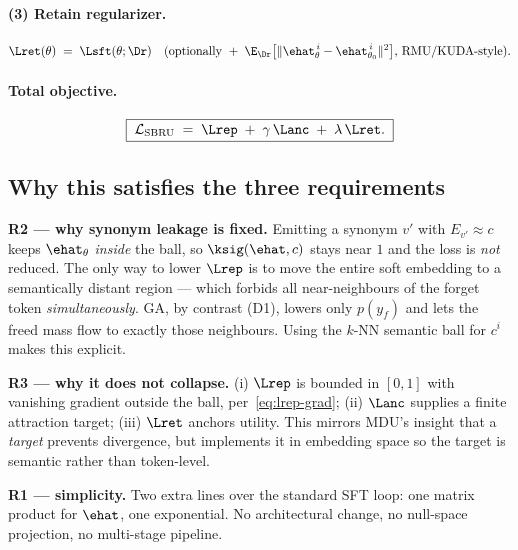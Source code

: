 \paragraph{(3) Retain regularizer.}
\begin{equation}
\Lret(\theta) \;=\; \Lsft(\theta; \Dr)
\quad\text{(optionally }+\;\E_{\Dr}\big[\|\ehat_\theta^{\,i} - \ehat_{\theta_0}^{\,i}\|^2\big]\text{, RMU/KUDA-style).}
\label{eq:lret}
\end{equation}

\paragraph{Total objective.}
\begin{equation}
\boxed{\;\mathcal{L}_{\mathrm{SBRU}} \;=\; \Lrep \;+\; \gamma\,\Lanc \;+\; \lambda\,\Lret. \;}
\label{eq:total}
\end{equation}

\subsection{Why this satisfies the three requirements}

\begin{keybox}
\textbf{R2 --- why synonym leakage is fixed.} Emitting a synonym $v'$ with $E_{v'} \approx c$ keeps
$\ehat_\theta$ \emph{inside} the ball, so $\ksig(\ehat, c)$ stays near $1$ and the loss is \emph{not}
reduced. The only way to lower $\Lrep$ is to move the entire soft embedding to a semantically distant
region --- which forbids all near-neighbours of the forget token \emph{simultaneously}. GA, by contrast
(D1), lowers only $p(y_f)$ and lets the freed mass flow to exactly those neighbours. Using the $k$-NN
semantic ball for $c^i$ makes this explicit.

\medskip
\textbf{R3 --- why it does not collapse.} (i) $\Lrep$ is bounded in $[0,1]$ with vanishing gradient
outside the ball, per~\eqref{eq:lrep-grad}; (ii) $\Lanc$ supplies a finite attraction target; (iii)
$\Lret$ anchors utility. This mirrors MDU's insight that a \emph{target} prevents divergence, but
implements it in embedding space so the target is semantic rather than token-level.

\medskip
\textbf{R1 --- simplicity.} Two extra lines over the standard SFT loop: one matrix product for
$\ehat$, one exponential. No architectural change, no null-space projection, no multi-stage pipeline.
\end{keybox}
